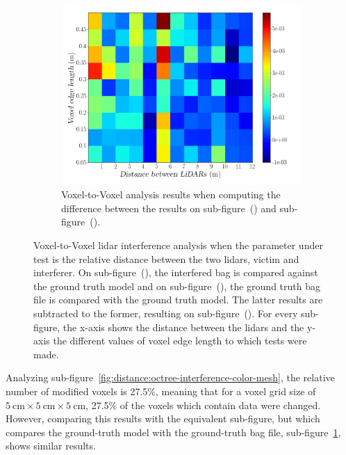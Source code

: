 \begin{figure}[!ht]
\begin{subfigure}[c]{0.45\textwidth}
	\label{fig:distance:octree-ground-truth-color-mesh}
\end{subfigure}
\\ \vspace{4mm}
\begin{subfigure}[c]{0.8\textwidth}
	\includegraphics[width=\textwidth]{img/lidar-interference/distance/octree_difference_color_mesh.png}
	\caption{Voxel-to-Voxel analysis results when computing the difference between the results on sub-figure~() and sub-figure~().}
	\label{fig:distance:octree-difference-color-mesh}
\end{subfigure}

\caption{Voxel-to-Voxel \ac{lidar} interference analysis when the parameter under test is the relative distance between the two \acp{lidar}, victim and interferer. On sub-figure~(), the interfered bag is compared against the ground truth model and on sub-figure~(), the ground truth bag file is compared with the ground truth model. The latter results are subtracted to the former, resulting on sub-figure~(). For every sub-figure, the x-axis shows the distance between the \acp{lidar} and the y-axis the different values of voxel edge length to which tests were made.}
\label{fig:distance:octree-color-mesh}
\end{figure}

Analyzing sub-figure~\ref{fig:distance:octree-interference-color-mesh}, the relative number of modified voxels is 27.5\%, meaning that for a voxel grid size of $\SI{5}{\centi\meter}\times \SI{5}{\centi\meter}\times \SI{5}{\centi\meter}$, 27.5\% of the voxels which contain data were changed. However, comparing this results with the equivalent sub-figure, but which compares the ground-truth model with the ground-truth bag file, sub-figure~\ref{fig:distance:octree-ground-truth-color-mesh}, shows similar results.

